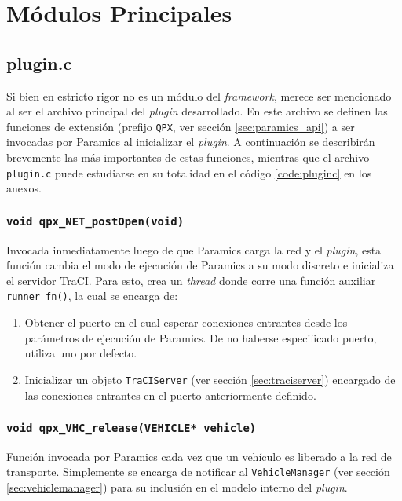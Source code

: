 \section{Módulos Principales}
\subsection{plugin.c}

Si bien en estricto rigor no es un módulo del \emph{framework}, merece ser mencionado al ser el archivo principal del \emph{plugin} desarrollado. En este archivo se definen las funciones de extensión (prefijo \texttt{QPX}, ver sección \ref{sec:paramics_api}) a ser invocadas por Paramics al inicializar el \emph{plugin}. A continuación se describirán brevemente las más importantes de estas funciones, mientras que el archivo \texttt{plugin.c} puede estudiarse en su totalidad en el código \ref{code:pluginc} en los anexos.

\subsubsection{\texttt{void qpx\_NET\_postOpen(void)}}\label{sec:qpx_postopen}

Invocada inmediatamente luego de que Paramics carga la red y el \emph{plugin}, esta función cambia el modo de ejecución de Paramics a su modo discreto e inicializa el servidor TraCI. Para esto, crea un \emph{thread} donde corre una función auxiliar \texttt{runner\_fn()}, la cual se encarga de:

\begin{enumerate}
    \item Obtener el puerto en el cual esperar conexiones entrantes desde los parámetros de ejecución de Paramics. De no haberse especificado puerto, utiliza uno por defecto.
    \item Inicializar un objeto \texttt{TraCIServer} (ver sección \ref{sec:traciserver}) encargado de las conexiones entrantes en el puerto anteriormente definido.
\end{enumerate}

\subsubsection{\texttt{void qpx\_VHC\_release(VEHICLE* vehicle)}}

Función invocada por Paramics cada vez que un vehículo es liberado a la red de transporte. Simplemente se encarga de notificar al \texttt{VehicleManager} (ver sección \ref{sec:vehiclemanager}) para su inclusión en el modelo interno del \emph{plugin}.

